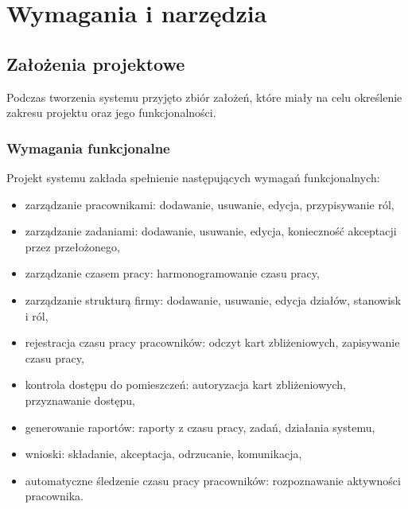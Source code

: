 \chapter{Wymagania i narzędzia}
\label{ch:wymagania-i-narzedzia}


\section{Założenia projektowe}


Podczas tworzenia systemu przyjęto zbiór założeń, które miały na celu określenie zakresu projektu oraz jego funkcjonalności.

\subsection{Wymagania funkcjonalne}

Projekt systemu zakłada spełnienie następujących wymagań funkcjonalnych:


\begin{itemize}
    \item zarządzanie pracownikami: dodawanie, usuwanie, edycja, przypisywanie ról,
    \item zarządzanie zadaniami: dodawanie, usuwanie, edycja, konieczność akceptacji przez przełożonego,
    \item zarządzanie czasem pracy: harmonogramowanie czasu pracy,
    \item zarządzanie strukturą firmy: dodawanie, usuwanie, edycja działów, stanowisk i ról,
    \item rejestracja czasu pracy pracowników: odczyt kart zbliżeniowych, zapisywanie czasu pracy,
    \item kontrola dostępu do pomieszczeń: autoryzacja kart zbliżeniowych, przyznawanie dostępu,
    \item generowanie raportów: raporty z czasu pracy, zadań, działania systemu,
    \item wnioski: składanie, akceptacja, odrzucanie, komunikacja,
    \item automatyczne śledzenie czasu pracy pracowników: rozpoznawanie aktywności pracownika.
\end{itemize}

